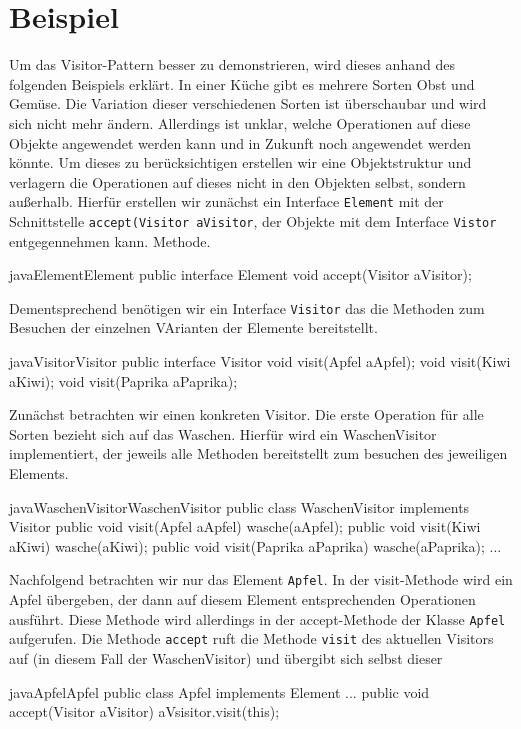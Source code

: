 \section{Beispiel}
Um das Visitor-Pattern besser zu demonstrieren, wird dieses anhand des folgenden Beispiels erklärt. In einer Küche gibt es mehrere Sorten Obst und Gemüse. Die Variation dieser verschiedenen Sorten ist überschaubar und wird sich nicht mehr ändern. Allerdings ist unklar, welche Operationen auf diese Objekte angewendet werden kann und in Zukunft noch angewendet werden könnte. Um dieses zu berücksichtigen erstellen wir eine Objektstruktur und verlagern die Operationen auf dieses nicht in den Objekten selbst, sondern außerhalb. Hierfür erstellen wir zunächst ein Interface \texttt{Element} mit der Schnittstelle \texttt{accept(Visitor aVisitor}, der Objekte mit dem Interface \texttt{Vistor} entgegennehmen kann.  Methode.

\begin{beispiel}{java}{Element}{Element}
public interface Element {
    void accept(Visitor aVisitor);
}
\end{beispiel}

Dementsprechend benötigen wir ein Interface \texttt{Visitor} das die Methoden zum Besuchen der einzelnen VArianten der Elemente bereitstellt.

\begin{beispiel}{java}{Visitor}{Visitor}
public interface Visitor {
    void visit(Apfel aApfel);
    void visit(Kiwi aKiwi);
    void visit(Paprika aPaprika);
}
\end{beispiel}
 
Zunächst betrachten wir einen konkreten Visitor. Die erste Operation für alle Sorten bezieht sich auf das Waschen. Hierfür wird ein WaschenVisitor implementiert, der jeweils alle Methoden bereitstellt zum besuchen des jeweiligen Elements. 


\begin{beispiel}{java}{WaschenVisitor}{WaschenVisitor}
public class WaschenVisitor implements Visitor {
    public void visit(Apfel aApfel) {
        wasche(aApfel);
    }
    public void visit(Kiwi aKiwi) {
        wasche(aKiwi);
    }
    public void visit(Paprika aPaprika) {
        wasche(aPaprika);
    }
    ...
}
\end{beispiel}

Nachfolgend betrachten wir nur das Element \texttt{Apfel}. In der visit-Methode wird ein Apfel übergeben, der dann auf diesem Element entsprechenden Operationen ausführt.
Diese Methode wird allerdings in der accept-Methode der Klasse \texttt{Apfel} aufgerufen. Die Methode \texttt{accept} ruft die Methode \texttt{visit} des aktuellen Visitors auf (in diesem Fall der WaschenVisitor) und übergibt sich selbst dieser



\begin{beispiel}{java}{Apfel}{Apfel}
public class Apfel implements Element {
	...
    public void accept(Visitor aVisitor) {
		aVsisitor.visit(this);
    }
}
\end{beispiel}




